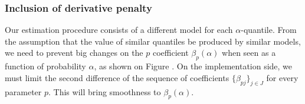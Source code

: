 %
%
%

\subsubsection{Inclusion of derivative penalty}
Our estimation procedure consists of a different model for each $\alpha$-quantile. From the assumption that the value of similar quantiles be produced by similar models, we need to prevent big changes on the $p$ coefficient $\beta_p(\alpha)$ when seen as a function of probability $\alpha$, as shown on Figure . On the implementation side, we must limit the second difference of the sequence of coefficients $\{\beta_{pj}\}_{j \in J}$ for every parameter $p$. This will bring smoothness to $\beta_p(\alpha)$.

